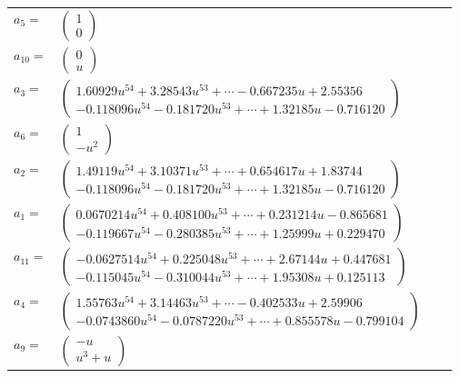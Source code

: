 \documentclass[1p]{elsarticle_modified}
\theoremstyle{definition}
\begin{document}
\begin{tabular}{m{7pt} m{180pt} m{7pt} m{180pt} }
\flushright $a_{5}=$&$\begin{pmatrix}1\\0\end{pmatrix}$ \\
\flushright $a_{10}=$&$\begin{pmatrix}0\\u\end{pmatrix}$ \\
\flushright $a_{3}=$&$\begin{pmatrix}1.60929 u^{54}+3.28543 u^{53}+\cdots-0.667235 u+2.55356\\-0.118096 u^{54}-0.181720 u^{53}+\cdots+1.32185 u-0.716120\end{pmatrix}$ \\
\flushright $a_{6}=$&$\begin{pmatrix}1\\- u^2\end{pmatrix}$ \\
\flushright $a_{2}=$&$\begin{pmatrix}1.49119 u^{54}+3.10371 u^{53}+\cdots+0.654617 u+1.83744\\-0.118096 u^{54}-0.181720 u^{53}+\cdots+1.32185 u-0.716120\end{pmatrix}$ \\
\flushright $a_{1}=$&$\begin{pmatrix}0.0670214 u^{54}+0.408100 u^{53}+\cdots+0.231214 u-0.865681\\-0.119667 u^{54}-0.280385 u^{53}+\cdots+1.25999 u+0.229470\end{pmatrix}$ \\
\flushright $a_{11}=$&$\begin{pmatrix}-0.0627514 u^{54}+0.225048 u^{53}+\cdots+2.67144 u+0.447681\\-0.115045 u^{54}-0.310044 u^{53}+\cdots+1.95308 u+0.125113\end{pmatrix}$ \\
\flushright $a_{4}=$&$\begin{pmatrix}1.55763 u^{54}+3.14463 u^{53}+\cdots-0.402533 u+2.59906\\-0.0743860 u^{54}-0.0787220 u^{53}+\cdots+0.855578 u-0.799104\end{pmatrix}$ \\
\flushright $a_{9}=$&$\begin{pmatrix}- u\\u^3+u\end{pmatrix}$ \\

\end{tabular}
\end{document}
